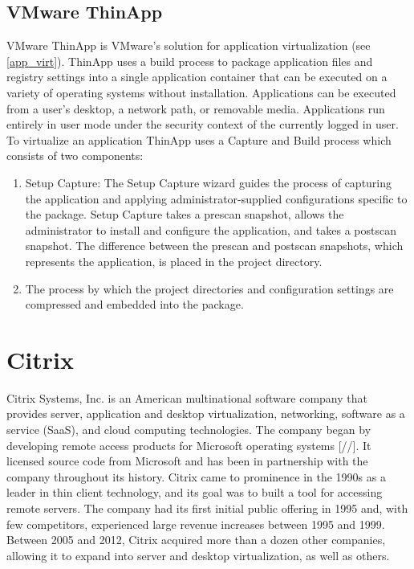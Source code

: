 \subsection{VMware ThinApp}
VMware ThinApp is VMware's solution for application virtualization (see \ref{app_virt}). ThinApp uses a build process to package application files and registry settings into a single application container that can be executed on a variety of operating systems without installation. Applications can be executed from a user's desktop, a network path, or removable media. Applications run entirely in user mode under the security context of the currently logged in user. To virtualize an application ThinApp uses a Capture and Build process which consists of two components:
\begin{enumerate}
\item Setup Capture: The Setup Capture wizard guides the process of capturing the application and applying administrator-supplied configurations specific to the package. Setup Capture takes a prescan snapshot, allows the administrator to install and configure the application, and takes a postscan snapshot. The difference between the prescan and postscan snapshots, which represents the application, is placed in the project directory.
\item The process by which the project directories and configuration settings are compressed and embedded into the package.
\end{enumerate}

\section{Citrix \cite{citrix}}
Citrix Systems, Inc. is an American multinational software company that provides server, application and desktop virtualization, networking, software as a service (SaaS), and cloud computing technologies. The company began by developing remote access products for Microsoft operating systems [//]. It licensed source code from Microsoft and has been in partnership with the company throughout its history. Citrix came to prominence in the 1990s as a leader in thin client technology, and its goal was to built a tool for accessing remote servers. The company had its first initial public offering in 1995 and, with few competitors, experienced large revenue increases between 1995 and 1999. Between 2005 and 2012, Citrix acquired more than a dozen other companies, allowing it to expand into server and desktop virtualization, as well as others.

